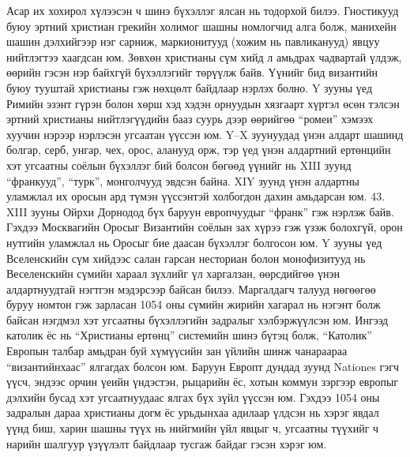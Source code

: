 Асар их хохирол хүлээсэн ч шинэ бүхэллэг ялсан нь тодорхой билээ. Гностикууд буюу эртний христиан грекийн холимог шашны номлогчид алга болж, манихейн шашин дэлхийгээр нэг сарниж, маркионитууд (хожим нь павликанууд) явцуу нийтлэгтээ хаагдсан юм. Зөвхөн христианы сүм хийд л амьдрах чадвартай үлдэж, өөрийн гэсэн нэр байхгүй бүхэллэгийг төрүүлж байв. Үүнийг бид византийн буюу тууштай христианы гэж нөхцөлт байдлаар нэрлэх болно. Y зууны үед Римийн эзэнт гүрэн болон хөрш хэд хэдэн орнуудын хязгаарт хүртэл өсөн тэлсэн эртний христианы нийтлэгүүдийн бааз суурь дээр өөрийгөө “ромеи” хэмээх хуучин нэрээр нэрлэсэн угсаатан үүссэн юм. Y–X зуунуудад үнэн алдарт шашинд болгар, серб, унгар, чех, орос, аланууд орж, тэр үед үнэн алдартний ертөнцийн хэт угсаатны соёлын бүхэллэг бий болсон бөгөөд үүнийг нь XIII зуунд “франкууд”, “турк”, монголчууд эвдсэн байна. XIY зуунд үнэн алдартны уламжлал их оросын ард түмэн үүссэнтэй холбогдон дахин амьдарсан юм. 43. XIII зууны Ойрхи Дорнодод бүх баруун европчуудыг “франк” гэж нэрлэж байв.
Гэхдээ Москвагийн Оросыг Византийн соёлын зах хүрээ гэж үзэж болохгүй, орон нутгийн уламжлал нь Оросыг бие даасан бүхэллэг болгосон юм. Y зууны үед Вселенскийн сүм хийдээс салан гарсан несториан болон монофизитууд нь Веселенскийн сүмийн хараал зүхлийг үл харгалзан, өөрсдийгөө үнэн алдартнуудтай нэгтгэн мэдэрсээр байсан билээ. Маргалдагч талууд нөгөөгөө буруу номтон гэж зарласан 1054 оны сүмийн жирийн хагарал нь нэгэнт болж байсан нэгдмэл хэт угсаатны бүхэллэгийн задралыг хэлбэржүүлсэн юм. Ингээд католик ёс нь “Христианы ертөнц” системийн шинэ бүтэц болж, “Католик” Европын талбар амьдран буй хүмүүсийн зан үйлийн шинж чанараараа “византийнхаас” ялгагдах болсон юм. Баруун Европт дундад зуунд Nationes гэгч үүсч, эндээс орчин үеийн үндэстэн, рыцарийн ёс, хотын коммун зэргээр европыг дэлхийн бусад хэт угсаатнуудаас ялгах бүх зүйл үүссэн юм.
Гэхдээ 1054 оны задралын дараа христианы догм ёс урьдынхаа адилаар үлдсэн нь хэрэг явдал үүнд биш, харин шашны түүх нь нийгмийн үйл явцыг ч, угсаатны түүхийг ч нарийн шалгуур үзүүлэлт байдлаар тусгаж байдаг гэсэн хэрэг юм.
